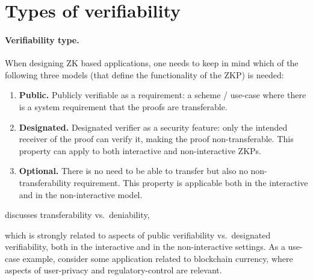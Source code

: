\section{Types of verifiability}   %
\label{apps:scope-use-cases}


\paragraph{Verifiability type.}

When designing ZK based applications, one needs to keep in mind which of the following three models (that define the functionality of the ZKP) is needed:

\begin{enumerate}

    \item \textbf{Public.}
		Publicly verifiable as a requirement: a scheme / use-case where 
	there is a system requirement that the proofs are transferable. %
		

		
    \item \textbf{Designated.} 
		Designated verifier as a security feature: only the intended receiver of the proof can verify it, making the proof non-transferable. 
		This property can apply to both interactive and non-interactive ZKPs.

		
    \item \textbf{Optional.} %
		There is no need to be able to transfer but also no non-transferability requirement. %
		This property is applicable both in the interactive and in the non-interactive model.

\end{enumerate}


	 discusses transferability vs.\ deniability, %

which is strongly related to aspects of public verifiability vs.\ designated verifiability,
both in the interactive and in the non-interactive settings.
	As a use-case example, consider some application related to blockchain currency, where aspects of user-privacy and regulatory-control are relevant.
	
